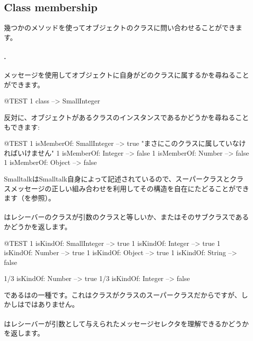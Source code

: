 \documentclass[a4paper,10pt,twoside]{book}
\begin{document}
\subsection{Class membership}
幾つかのメソッドを使ってオブジェクトのクラスに問い合わせることができます。

\paragraph{.} メッセージを使用してオブジェクトに自身がどのクラスに属するかを尋ねることができます。
\begin{code}{@TEST}
1 class --> SmallInteger
\end{code}

反対に、オブジェクトがあるクラスのインスタンスであるかどうかを尋ねることもできます:
\begin{code}{@TEST}
1 isMemberOf: SmallInteger --> true    "まさにこのクラスに属していなければいけません"
1 isMemberOf: Integer          --> false
1 isMemberOf: Number        --> false
1 isMemberOf: Object           --> false
\end{code}

SmalltalkはSmalltalk自身によって記述されているので、スーパークラスとクラスメッセージの正しい組み合わせを利用してその構造を自在にたどることができます（を参照）。

\paragraph{}
はレシーバーのクラスが引数のクラスと等しいか、またはそのサブクラスであるかどうかを返します。

\begin{code}{@TEST}
1 isKindOf: SmallInteger --> true
1 isKindOf: Integer          --> true
1 isKindOf: Number         --> true
1 isKindOf: Object           --> true
1 isKindOf: String            --> false

1/3 isKindOf: Number      --> true
1/3 isKindOf: Integer        --> false
\end{code}

であるはの一種です。これはクラスがクラスのスーパークラスだからですが、しかしはではありません。

\paragraph{}
はレシーバーが引数として与えられたメッセージセレクタを理解できるかどうかを返します。
\end{document}
